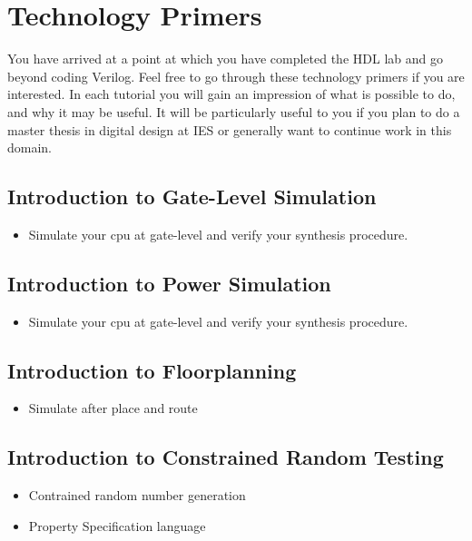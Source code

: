 \newpage
\section{Technology Primers}


You have arrived at a point at which you have completed the HDL lab and go beyond coding Verilog. Feel free to go through these technology primers if you are interested. In each tutorial you will gain an impression of what is possible to do, and why it may be useful. It will be particularly useful to you if you plan to do a master thesis in digital design at IES or generally want to continue work in this domain.

\subsection{Introduction to Gate-Level Simulation}
\begin{itemize}
\item Simulate your cpu at gate-level and verify your synthesis procedure.
\end{itemize}

\subsection{Introduction to Power Simulation}
\begin{itemize}
\item Simulate your cpu at gate-level and verify your synthesis procedure.
\end{itemize}

\subsection{Introduction to Floorplanning}
\begin{itemize}
\item Simulate after place and route
\end{itemize}

\subsection{Introduction to Constrained Random Testing}
\begin{itemize}
\item Contrained random number generation
\item Property Specification language
\end{itemize}

